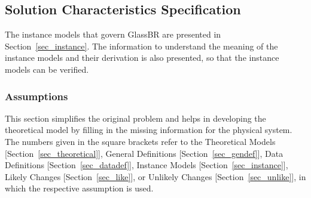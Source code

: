 \documentclass[12pt]{article}
\newcommand{\progname}{GlassBR}
\begin{document}
\subsection{Solution Characteristics Specification}

The instance models that govern \progname{} are presented in Section~\ref{sec_instance}. The information
to understand the meaning of the instance models and their derivation is also presented, so
that the instance models can be verified.

\subsubsection{Assumptions} \label{Assumptions}

This section simplifies the original problem and helps in developing the
theoretical model by filling in the missing information for the physical
system. The numbers given in the square brackets refer to the Theoretical 
Models [Section~\ref{sec_theoretical}], General Definitions 
[Section~\ref{sec_gendef}], Data Definitions [Section~\ref{sec_datadef}], Instance
Models [Section~\ref{sec_instance}], Likely Changes [Section~\ref{sec_like}],
or Unlikely Changes [Section~\ref{sec_unlike}], in which the respective 
assumption is used.
\end{document}
